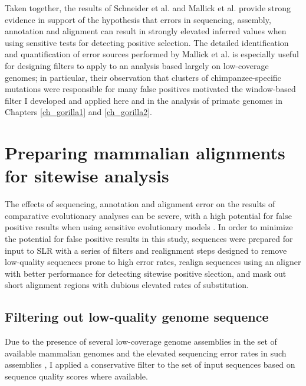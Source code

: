 Taken together, the results of Schneider et
al. \citeyearpar{Schneider2009} and Mallick et
al. \citeyearpar{Mallick2009} provide strong evidence in support of
the hypothesis that errors in sequencing, assembly, annotation and
alignment can result in strongly elevated inferred \omg values when
using sensitive tests for detecting positive selection. The detailed
identification and quantification of error sources performed by
Mallick et al. \citeyearpar{Mallick2009} is especially useful for
designing filters to apply to an analysis based largely on
low-coverage genomes; in particular, their observation that clusters
of chimpanzee-specific mutations were responsible for many false
positives motivated the window-based filter I developed and applied
here and in the analysis of primate genomes in Chapters
\ref{ch_gorilla1} and \ref{ch_gorilla2}.


\section{Preparing mammalian alignments for sitewise analysis}

The effects of sequencing, annotation and alignment error on the
results of comparative evolutionary analyses can be severe, with a
high potential for false positive results when using sensitive
evolutionary models \citep{Mallick2009,Schneider2009}. In order to
minimize the potential for false positive results in this study,
sequences were prepared for input to SLR with a series of filters and
realignment steps designed to remove low-quality sequences prone
to high error rates, realign sequences using an aligner with
better performance for detecting sitewise positive slection, and
mask out short alignment regions with dubious elevated rates of \nsyn
substitution.

\subsection{Filtering out low-quality genome sequence}

Due to the presence of several low-coverage genome assemblies in the
set of available mammalian genomes and the elevated sequencing error
rates in such assemblies \citep{Hubbard2007}, I applied a conservative
filter to the set of input sequences based on sequence quality scores
where available.

